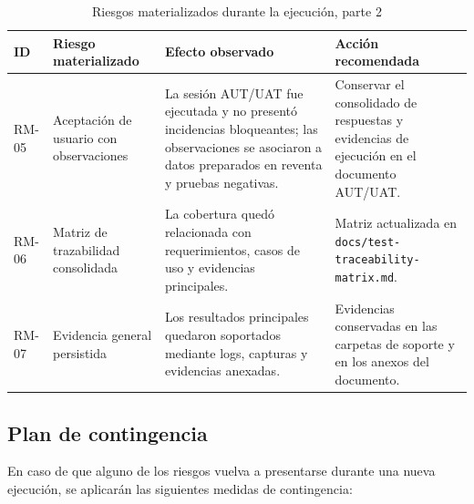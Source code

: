\documentclass[12pt,letterpaper]{article}
\begin{document}
\begin{table}[H]
\centering
\begingroup
\scriptsize
\setlength{\tabcolsep}{2.5pt}
\renewcommand{\arraystretch}{1.18}

\begin{tabularx}{\textwidth}{|
>{\centering\arraybackslash}p{1.3cm}|
>{\raggedright\arraybackslash}p{4.0cm}|
>{\raggedright\arraybackslash}p{4.0cm}|
>{\raggedright\arraybackslash}X|}
\hline
\textbf{ID} & \textbf{Riesgo materializado} & \textbf{Efecto observado} & \textbf{Acción recomendada} \\
\hline
RM-05 & Aceptación de usuario con observaciones & La sesión AUT/UAT fue ejecutada y no presentó incidencias bloqueantes; las observaciones se asociaron a datos preparados en reventa y pruebas negativas. & Conservar el consolidado de respuestas y evidencias de ejecución en el documento AUT/UAT. \\
\hline
RM-06 & Matriz de trazabilidad consolidada & La cobertura quedó relacionada con requerimientos, casos de uso y evidencias principales. & Matriz actualizada en \texttt{docs/test-traceability-matrix.md}. \\
\hline
RM-07 & Evidencia general persistida & Los resultados principales quedaron soportados mediante logs, capturas y evidencias anexadas. & Evidencias conservadas en las carpetas de soporte y en los anexos del documento. \\
\hline
\end{tabularx}

\endgroup
\caption{Riesgos materializados durante la ejecución, parte 2}
\label{tab:riesgos-materializados-2}
\end{table}

\subsection{Plan de contingencia}

En caso de que alguno de los riesgos vuelva a presentarse durante una nueva ejecución, se aplicarán las siguientes medidas de contingencia:
\end{document}
